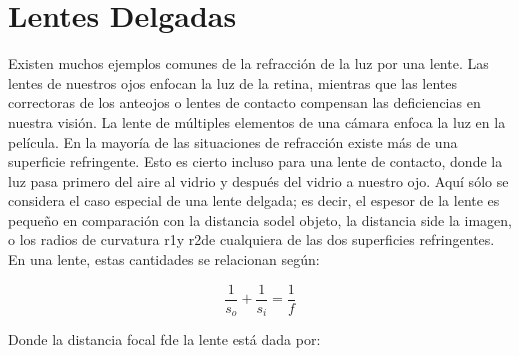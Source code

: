 \documentclass[13,twocolumn,letterpaper]{article}
\begin{document}
    
    \section*{Lentes Delgadas} 
    
    
    Existen muchos ejemplos comunes de la refracción de la luz por una lente. Las lentes de nuestros ojos  enfocan  la  luz  de  la  retina,  mientras  que  las  lentes  correctoras  de  los  anteojos  o  lentes  de contacto compensan  las deficiencias en  nuestra  visión. La  lente de múltiples elementos de una cámara enfoca la luz en la película. En la mayoría de las situaciones de refracción existe más de una superficie refringente.  Esto es  cierto  incluso para una  lente de contacto, donde  la  luz pasa primero  del  aire  al  vidrio  y  después  del  vidrio  a  nuestro  ojo.  Aquí  sólo  se  considera  el  caso especial de una lente delgada; es decir, el espesor de la lente es pequeño en comparación con la distancia sodel objeto, la distancia side la imagen, o los radios de curvatura r1y r2de cualquiera de las dos superficies refringentes. En una lente, estas cantidades se relacionan según: 
    
    \[ \frac{1}{s_{o}} +  \frac{1}{s_{i}} = \frac{1}{f} \]
    
    Donde la distancia focal fde la lente está dada por:
    
\end{document}
